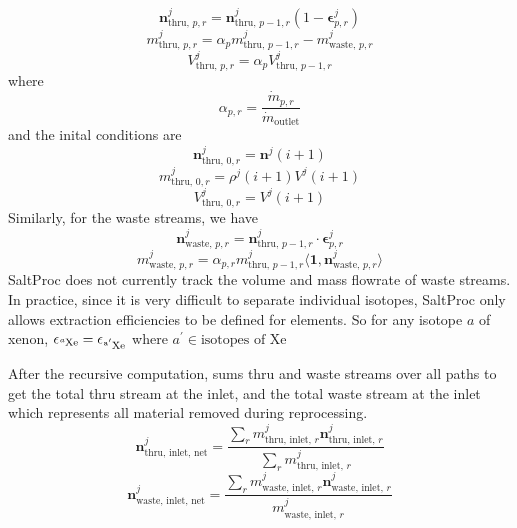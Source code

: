 \begin{equation}
    \mathbf{n}^{j}_{\text{thru, }p,r} = \mathbf{n}^{j}_{\text{thru, }p-1,r} (1 - \mathbf{\epsilon}^{j}_{p,r})
\end{equation}
\begin{equation}
    m^{j}_{\text{thru, } p,r} = \alpha_{p} m^{j}_{\text{thru, }p-1,r} - m^{j}_{\text{waste, }p,r}
\end{equation}
\begin{equation}
    V^{j}_{\text{thru, }p,r} = \alpha_{p}V^{j}_{\text{thru, }p-1,r}
\end{equation}
where 
\begin{equation}
    \alpha_{p,r} = \frac{\dot{m}_{p,r}}{\dot{m}_{\text{outlet}}}
\end{equation}
and the inital conditions are 
\begin{equation}
    \mathbf{n}^{j}_{\text{thru, }0,r} = \mathbf{n}^{j}(i+1)
\end{equation}
\begin{equation}
    m^{j}_{\text{thru, }0,r} = \rho^{j}(i+1)V^{j}(i+1)
\end{equation}
\begin{equation}
    V^{j}_{\text{thru, }0,r} = V^{j}(i+1)
\end{equation}
Similarly, for the waste streams, we have
\begin{equation}
    \mathbf{n}^{j}_{\text{waste, }p,r} = \mathbf{n}^{j}_{\text{thru, }p-1,r} \cdot \mathbf{\epsilon}^{j}_{p,r}
\end{equation}
\begin{equation}
    m^{j}_{\text{waste, }p,r} = \alpha_{p,r} m^{j}_{\text{thru, }p-1,r} \langle\mathbf{1},\mathbf{n}^{j}_{\text{waste, }p,r}\rangle
\end{equation}
SaltProc does not currently track the volume and mass flowrate of waste streams.
In practice, since it is very difficult to separate individual isotopes,
SaltProc only allows extraction efficiencies to be defined for elements. So for
any isotope $a$ of xenon,
$\epsilon_{\ce{^{a}Xe}} = \epsilon_{\ce{^{a^{\prime}}Xe}}$  where
$a^{\prime} \in \text{isotopes of Xe}$

After the recursive computation, \SaltProc sums thru and waste streams over all
paths to get the total thru stream at the inlet, and the total waste stream at
the inlet which represents all material removed during reprocessing.
\begin{equation}
    \mathbf{n}^{j}_{\text{thru, inlet, net}} = \frac{\sum_{r} m^{j}_{\text{thru, inlet, }r} \mathbf{n}^{j}_{\text{thru, inlet, }r}}{\sum_{r} m^{j}_{\text{thru, inlet, }r}}
\end{equation}
\begin{equation}
    \mathbf{n}^{j}_{\text{waste, inlet, net}} = \frac{\sum_{r} m^{j}_{\text{waste, inlet, }r} \mathbf{n}^{j}_{\text{waste, inlet, }r}}{m^{j}_{\text{waste, inlet, }r}}
\end{equation}

